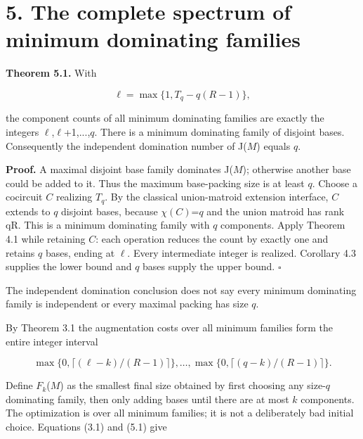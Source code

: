 \documentclass[11pt]{article}
\begin{document}
\section*{5. The complete spectrum of minimum dominating families}

\textbf{Theorem 5.1.} With

\[
\ell=\max\{1,T_q-q(R-1)\},
\]

the component counts of all minimum dominating families are exactly the integers \(\ell\),\(\ell\)+1,...,\(q\). There is a minimum dominating family of disjoint bases. Consequently the independent domination number of J(\(M\)) equals \(q\).

\textbf{Proof.} A maximal disjoint base family dominates J(\(M\)); otherwise another base could be added to it. Thus the maximum base-packing size is at least \(q\). Choose a cocircuit \(C\) realizing \(T_q\). By the classical union-matroid extension interface, \(C\) extends to \(q\) disjoint bases, because \(\chi(C)\)=\(q\) and the union matroid has rank qR. This is a minimum dominating family with \(q\) components. Apply Theorem 4.1 while retaining \(C\): each operation reduces the count by exactly one and retains \(q\) bases, ending at \(\ell\). Every intermediate integer is realized. Corollary 4.3 supplies the lower bound and \(q\) bases supply the upper bound. \hfill\ensuremath{\square}

The independent domination conclusion does not say every minimum dominating family is independent or every maximal packing has size \(q\).

By Theorem 3.1 the augmentation costs over all minimum families form the entire integer interval

\[
\max\{0,\lceil(\ell-k)/(R-1)\rceil\},\ldots,
\max\{0,\lceil(q-k)/(R-1)\rceil\}.                 \tag{5.1}
\]

Define \(F_k\)(\(M\)) as the smallest final size obtained by first choosing any size-\(q\) dominating family, then only adding bases until there are at most \(k\) components. The optimization is over all minimum families; it is not a deliberately bad initial choice. Equations (3.1) and (5.1) give
\end{document}
